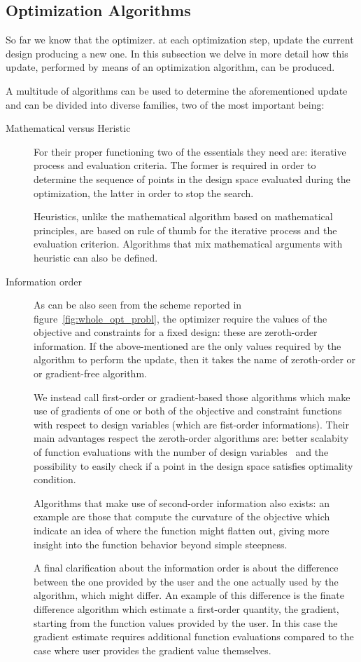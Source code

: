 \subsection{Optimization Algorithms}

So far we know that the optimizer. at each optimization step, update the current design producing a new one. In this subsection we delve in more detail how this update, performed by means of an optimization algorithm, can be produced.

A multitude of algorithms can be used to determine the aforementioned update and can be divided into diverse families, two of the most important being:
\begin{description}
	\item[Mathematical versus Heristic] For their proper functioning two of the essentials they need are: iterative process and evaluation criteria. The former is required in order to determine the sequence of points in the design space evaluated during the optimization, the latter in order to stop the search.
	
	Heuristics, unlike the mathematical algorithm based on mathematical principles, are based on rule of thumb for the iterative process and the evaluation criterion. Algorithms that mix mathematical arguments with heuristic can also be defined.
	
	
	\item[Information order] As can be also seen from the scheme reported in figure~\ref{fig:whole_opt_probl}, the optimizer require the values of the objective and constraints for a fixed design: these are zeroth-order information. If the above-mentioned are the only values required by the algorithm to perform the update, then it takes the name of zeroth-order or or gradient-free algorithm.
	
	We instead call first-order or gradient-based those algorithms which make use of gradients of one or both of the objective and constraint functions with respect to design variables (which are fist-order informations). Their main advantages respect the zeroth-order algorithms are: better scalabity of function evaluations with the number of design variables~\cite{Joaquim:engineering_design_opt} and the possibility to easily check if a point in the design space satisfies optimality condition.
	
	Algorithms that make use of second-order information also exists: an example are those that compute the curvature of the objective which indicate an idea of where the function might flatten out, giving more insight into the function behavior beyond simple steepness.
	
	A final clarification about the information order is about the difference between the one provided by the user and the one actually used by the algorithm, which might differ. An example of this difference is the finate difference algorithm which estimate a first-order quantity, the gradient, starting from the function values provided by the user. In this case the gradient estimate requires additional function evaluations compared to the case where user provides the gradient value themselves.
\end{description}

